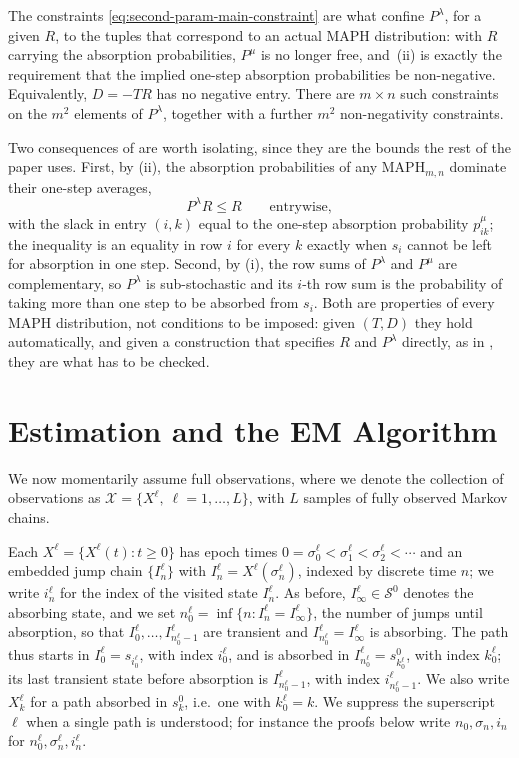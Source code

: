 \documentclass{article}
\newcommand{\X}{{\mathcal{X}}}
\newcommand{\cs}{\mathcal{S}}
\newcommand{\subchg}[1]{#1}
\begin{document}
\subchg{The constraints \eqref{eq:second-param-main-constraint} are what confine $P^\lambda$, for a
given $R$, to the tuples that correspond to an actual MAPH distribution: with $R$ carrying the
absorption probabilities, $P^\mu$ is no longer free, and \Cref{lem:feasible-jump}\,\textup{(ii)} is
exactly the requirement that the implied one-step absorption probabilities be non-negative.
Equivalently, $D=-TR$ has no negative entry. There are
$m \times n$ such constraints on the $m^2$ elements of $P^\lambda$, together with a further $m^2$
non-negativity constraints.}

\subchg{Two consequences of  are worth isolating, since they are the bounds
the rest of the paper uses. First, by \textup{(ii)}, the absorption probabilities of any
$\text{MAPH}_{m,n}$ dominate their one-step averages,
%
\begin{equation}
\label{eq:R-bound}
P^\lambda R \le R
\qquad \text{entrywise},
\end{equation}
%
with the slack in entry $(i,k)$ equal to the one-step absorption probability $p^\mu_{ik}$; the
inequality is an equality in row $i$ for every $k$ exactly when $s_i$ cannot be left for absorption
in one step. Second, by \textup{(i)}, the row sums of $P^\lambda$ and $P^\mu$ are complementary, so
$P^\lambda$ is sub-stochastic and its $i$-th row sum is the probability of taking more than one step
to be absorbed from $s_i$. Both are properties of every MAPH distribution, not conditions to be
imposed: given $(T,D)$ they hold automatically, and given a construction that specifies $R$ and
$P^\lambda$ directly, as in \Cref{sec:init-heuristic}, they are what has to be checked.}

\section{Estimation and the EM Algorithm}
\label{sec:full-path-mle}

We now momentarily assume full observations, where we denote the collection of observations as $\X = \{X^\ell,~\ell=1,\ldots,L \}$, with $L$ samples of fully observed Markov chains.

Each $X^\ell=\{X^\ell(t):t\geq 0\}$ has epoch times $0 = \sigma_0^\ell < \sigma_1^\ell < \sigma_2^\ell < \cdots$ and an embedded jump chain $\{I_n^\ell\}$ with $I_n^\ell = X^\ell(\sigma_n^\ell)$, indexed by discrete time $n$; we write $i_n^\ell$ for the index of the visited state $I_n^\ell$. As before, $I_\infty^\ell \in \cs^0$ denotes the absorbing state, and we set $n_0^\ell = \inf\{n : I_n^\ell = I_\infty^\ell\}$, the number of jumps until absorption, so that $I_0^\ell,\ldots,I_{n_0^\ell-1}^\ell$ are transient and $I_{n_0^\ell}^\ell = I_\infty^\ell$ is absorbing. The path thus starts in $I_0^\ell = s_{i_0^\ell}$, with index $i_0^\ell$, and is absorbed in $I_{n_0^\ell}^\ell = s^0_{k_0^\ell}$, with index $k_0^\ell$; its last transient state before absorption is $I_{n_0^\ell-1}^\ell$, with index $i_{n_0^\ell-1}^\ell$. We also write $X^\ell_k$ for a path absorbed in $s_k^0$, i.e.\ one with $k_0^\ell = k$. We suppress the superscript $\ell$ when a single path is understood; for instance the proofs below write $n_0, \sigma_n, i_n$ for $n_0^\ell, \sigma_n^\ell, i_n^\ell$.
\end{document}
